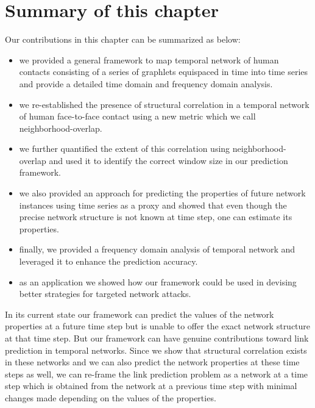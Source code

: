 \noindent
\section{Summary of this chapter}
\label{conclusion}

Our contributions in this chapter can be summarized as below:
\begin{itemize}

\item we provided a general framework to map temporal network of human contacts consisting of a series of graphlets equispaced in time into time series
and provide a detailed time domain and frequency domain analysis.

\item we re-established the presence of structural correlation in a temporal network of human face-to-face contact using a new metric which we call
neighborhood-overlap.

\item we further quantified the extent of this correlation using neighborhood-overlap and used it to identify the correct window size in our prediction framework.

\item we also provided an approach for predicting the properties of future network instances using time series as a proxy and showed that even though the 
precise network structure is not known at time step, one can estimate its properties.

\item finally, we provided a frequency domain analysis of temporal network and leveraged it to enhance the prediction accuracy.

\item as an application we showed how our framework could be used in devising better strategies for targeted network attacks.
 
 \end{itemize}
 
 In its current state our framework can predict the values of the network properties at a future time step but is unable to offer the exact network 
 structure at that time step. But our framework can have genuine contributions toward link prediction in temporal networks. Since we show that structural 
 correlation exists in these networks and we can also predict the network properties at these time steps as well, we can re-frame the link prediction problem 
 as a network at a time step which is obtained from the network at a previous time step with minimal changes made depending on the values of the properties. 


\medskip